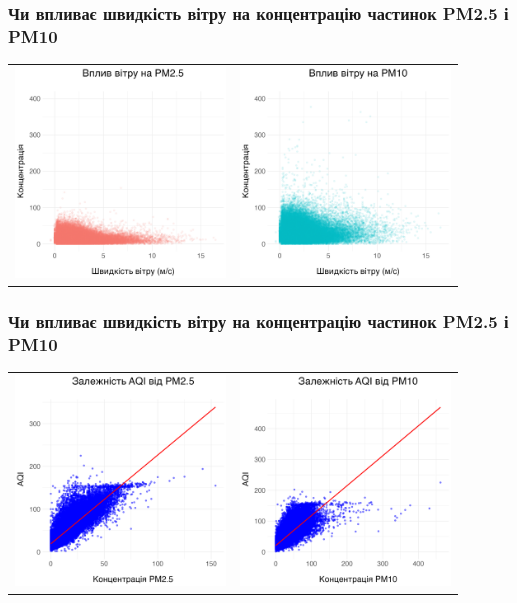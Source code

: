 \documentclass{beamer}
\begin{document}
\begin{frame}
  \frametitle{Чи впливає швидкість вітру на концентрацію частинок PM2.5 і PM10}

  \begin{tabular}{cc}
    \includegraphics[height=2.2in]{plots/question1/wind_speed_vs_pm2_5.png} &
    \includegraphics[height=2.2in]{plots/question1/wind_speed_vs_pm10.png}
  \end{tabular}
\end{frame}

\begin{frame}
  \frametitle{Чи впливає швидкість вітру на концентрацію частинок PM2.5 і PM10}

  \begin{tabular}{cc}
    \includegraphics[height=2.2in]{plots/question1/aqi_pm2_5_diagram.png} &
    \includegraphics[height=2.2in]{plots/question1/aqi_pm10_diagram.png}
  \end{tabular}
\end{frame}
\end{document}

